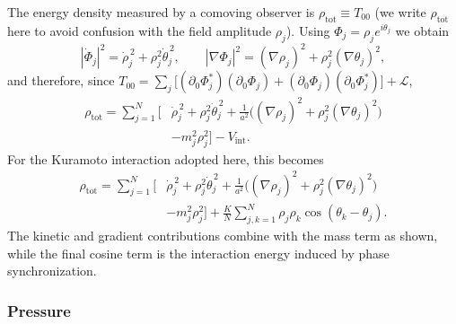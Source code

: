 The energy density measured by a comoving observer is $\rho_{\mathrm{tot}} \equiv T_{00}$ (we write $\rho_{\mathrm{tot}}$ here to avoid confusion with the field amplitude $\rho_j$). Using $\Phi_j=\rho_j e^{i\theta_j}$ we obtain
\begin{equation}
    |\dot{\Phi}_j|^2 = \dot{\rho}_j^{\,2} + \rho_j^2\dot{\theta}_j^{\,2},
    \qquad
    |\nabla\Phi_j|^2 = (\nabla\rho_j)^2 + \rho_j^2(\nabla\theta_j)^2,
\end{equation}
and therefore, since $T_{00}=\sum_j\big[(\partial_0\Phi_j^*)(\partial_0\Phi_j)+(\partial_0\Phi_j)(\partial_0\Phi_j^*)\big]+\mathcal{L}$,
\begin{equation}
    {
    \begin{aligned}
        \rho_{\mathrm{tot}} = \sum_{j=1}^N \Bigg[ &\dot{\rho}_j^{\,2}
        + \rho_j^2\dot{\theta}_j^{\,2}
        + \frac{1}{a^2}\Big((\nabla\rho_j)^2
        + \rho_j^2(\nabla\theta_j)^2\Big) \\
        &- m_j^2\rho_j^2 \Bigg]
        - V_{\mathrm{int}} .
    \end{aligned}
    }
\end{equation}
For the Kuramoto interaction adopted here, this becomes
\begin{equation}
    {
    \begin{aligned}
        \rho_{\mathrm{tot}} = \sum_{j=1}^N \Bigg[ &\dot{\rho}_j^{\,2}
        + \rho_j^2\dot{\theta}_j^{\,2}
        + \frac{1}{a^2}\Big((\nabla\rho_j)^2
        + \rho_j^2(\nabla\theta_j)^2\Big) \\
        &- m_j^2\rho_j^2 \Bigg]
        + \frac{K}{N}\sum_{j,k=1}^N \rho_j\rho_k\cos(\theta_k-\theta_j) .
    \end{aligned}
    }
\end{equation}
The kinetic and gradient contributions combine with the mass term as shown, while the final cosine term is the interaction energy induced by phase synchronization.

\subsubsection*{Pressure}

